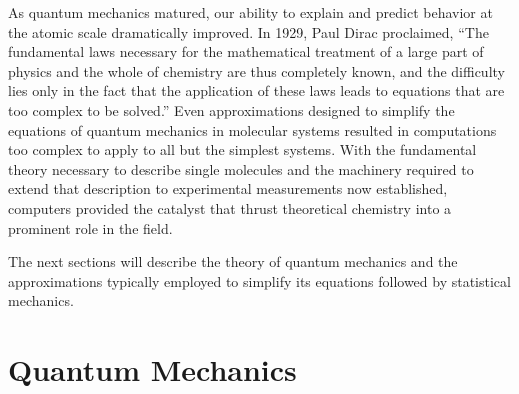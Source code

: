 As quantum mechanics matured, our ability to explain and predict behavior at the
atomic scale dramatically improved. In 1929, Paul Dirac proclaimed, ``The
fundamental laws necessary for the mathematical treatment of a large part of
physics and the whole of chemistry are thus completely known, and the difficulty
lies only in the fact that the application of these laws leads to equations that
are too complex to be solved.'' Even approximations designed to simplify the
equations of quantum mechanics in molecular systems resulted in computations too
complex to apply to all but the simplest systems. With the fundamental theory
necessary to describe single molecules and the machinery required to extend
that description to experimental measurements now established, computers
provided the catalyst that thrust theoretical chemistry into a prominent role in
the field.

The next sections will describe the theory of quantum mechanics and the
approximations typically employed to simplify its equations followed by
statistical mechanics.

\section{Quantum Mechanics}


